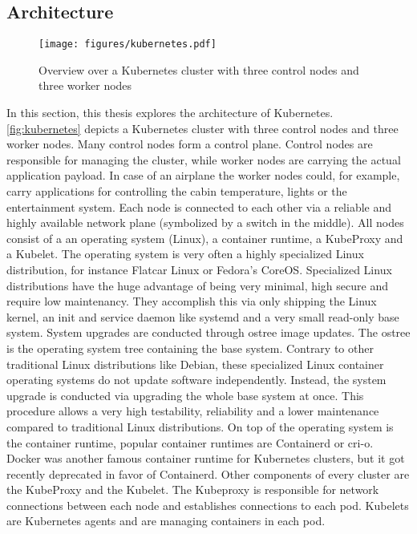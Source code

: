 \documentclass[titlepage]{report}
\begin{document}
\subsection{Architecture}
\begin{figure}[H]
    \centering
    \texttt{[image: figures/kubernetes.pdf]}
    \caption{Overview over a Kubernetes cluster with three control nodes and three worker nodes}\label{fig:kubernetes}
\end{figure}
In this section, this thesis explores the architecture of Kubernetes. \autoref{fig:kubernetes} depicts a Kubernetes cluster with three control nodes and three worker nodes. Many control nodes form a control plane.
Control nodes are responsible for managing the cluster, while worker nodes are carrying the actual application payload. In case of an airplane the worker nodes could, for example, carry applications for controlling
the cabin temperature, lights or the entertainment system. Each node is connected to each other via a reliable and highly available network plane (symbolized by a switch in the middle). All nodes consist of a
an operating system (Linux), a container runtime, a KubeProxy and a Kubelet. The operating system is very often a highly specialized Linux distribution, for instance Flatcar Linux\cite{FlatcarLinux} or Fedora's CoreOS\cite{FedoraCoreOS}.
Specialized Linux distributions have the huge advantage of being very minimal, high secure and require low maintenancy. They accomplish this via only shipping the Linux kernel, an init and service daemon like systemd\cite{systemd}
and a very small read-only base system. System upgrades are conducted through ostree image updates. The ostree is the operating system tree containing the base system. Contrary to other traditional Linux distributions like Debian,
these specialized Linux container operating systems do not update software independently. Instead, the system upgrade is conducted via upgrading the whole base system at once. This procedure allows a very high testability, reliability
and a lower maintenance compared to traditional Linux distributions. On top of the operating system is the container runtime, popular container runtimes are Containerd\cite{Containerd} or cri-o\cite{CRIO}. Docker was another famous
container runtime for Kubernetes clusters, but it got recently deprecated in favor of Containerd\cite{KubernetesDockerNews}. Other components of every cluster are the KubeProxy and the Kubelet. The Kubeproxy is responsible
for network connections between each node and establishes connections to each pod\cite{KubernetesComponents}. Kubelets are Kubernetes agents and are managing containers in each pod.
\end{document}
